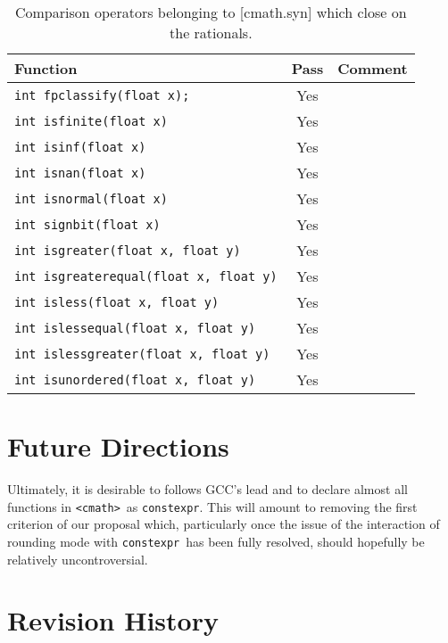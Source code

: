 \documentclass[prd,twocolumn,amsmath,amssymb,nofootinbib,eqsecnum]{revtex4-1}
\newcommand{\constexpr}{\code{constexpr}\xspace}
\newcommand{\code}[1]{{\tt #1}}
\newcommand{\header}[1]{{\tt <#1>}}
\newcommand{\cmath}{\header{cmath}}
\begin{document}
\begin{table}
	\begin{tabular}{lcc}
		Function & Pass & Comment
	\\
	\hline \hline
		\code{int fpclassify(float x);} & Yes &
	\\
	\hline
		\code{int isfinite(float x)} & Yes &
	\\
	\hline
		\code{int isinf(float x)} & Yes &
	\\
	\hline
		\code{int isnan(float x)} & Yes &
	\\
	\hline
		\code{int isnormal(float x)} & Yes &
	\\
	\hline
		\code{int signbit(float x)} & Yes &
	\\
	\hline
		\code{int isgreater(float x, float y)} & Yes &
	\\
	\hline
		\code{int isgreaterequal(float x, float y)} & Yes &
	\\
	\hline
		\code{int isless(float x, float y)} & Yes &
	\\
	\hline
		\code{int islessequal(float x, float y)} & Yes &
	\\
	\hline
		\code{int islessgreater(float x, float y)} & Yes &
	\\
	\hline
		\code{int isunordered(float x, float y)} & Yes &
	\end{tabular}
\caption{Comparison operators belonging to [cmath.syn] which close on the rationals.}
\label{tab:26.9.4}
\end{table}

\section{Future Directions}

Ultimately, it is desirable to follows GCC's lead and to declare almost all functions in \cmath\ as \constexpr. This will amount to removing the first criterion of our proposal which, particularly once the issue of the interaction of rounding mode with \constexpr\ has been fully resolved, should hopefully be relatively uncontroversial.

\section{Revision History}
\end{document}
